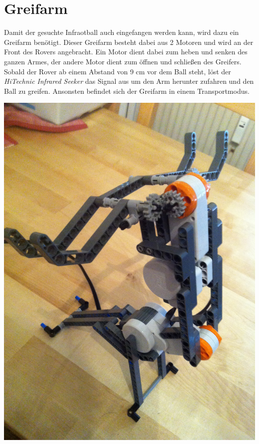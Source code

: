 \section{Greifarm}
Damit der gesuchte Infraotball auch eingefangen werden kann, wird dazu ein Greifarm benötigt. Dieser Greifarm besteht dabei aus 2 Motoren und wird an der Front des Rovers angebracht. Ein Motor dient dabei zum heben und senken des ganzen Armes, der andere Motor dient zum öffnen und schließen des Greifers. Sobald der Rover ab einem Abstand von 9 cm vor dem Ball steht, löst der \textit{HiTechnic Infrared Seeker} das Signal aus um den Arm herunter zufahren und den Ball zu greifen. Ansonsten befindet sich der Greifarm in einem Transportmodus.

\begin{capfigure}
	\includegraphics[width=\textwidth]{images/construction/greifarm/Greifarm1}
\end{capfigure}

